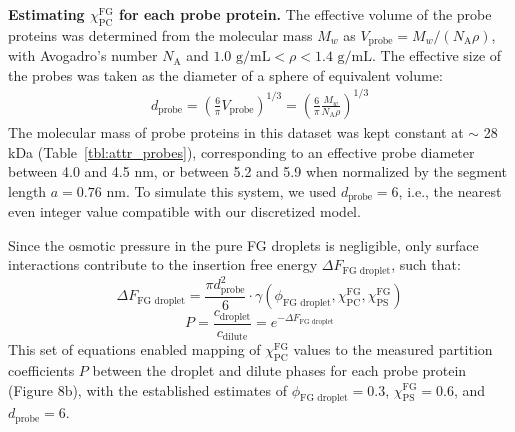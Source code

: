 \documentclass[10pt, a4paper, twocolumn]{article}
\newcommand{\todo}[1]{\pdfcomment{#1}} %
\begin{document}
\bigskip\noindent
\textbf{Estimating $\chi_\text{PC}^\text{FG}$ for each probe protein.} 
The effective volume of the probe proteins was determined from the molecular mass $M_w$ as $V_\text{probe} = M_w / (N_\text{A} \rho)$, with Avogadro's number $N_\text{A}$ and $1.0 \text{ g/mL} < \rho < 1.4 \text{ g/mL}$.
The effective size of the probes was taken as the diameter of a sphere of equivalent volume:
\begin{eqnarray}
    d_\text{probe} =
    \left( \frac{6}{\pi} V_\text{probe} \right)^{1/3} =
    \left( \frac{6}{\pi} \frac{M_w}{N_\text{A} \rho} \right)^{1/3}
\end{eqnarray}
The molecular mass of probe proteins in this dataset was kept constant at $\sim$ 28 kDa (Table~\ref{tbl:attr_probes}), corresponding to an effective probe diameter between 4.0 and 4.5 nm, or between 5.2 and 5.9 when normalized by the segment length $a = 0.76 \text{ nm}$.
To simulate this system, we used $d_\text{probe} = 6$, i.e., the nearest even integer value compatible with our discretized model.

Since the osmotic pressure in the pure FG droplets is negligible, only surface interactions contribute to the insertion free energy $\Delta F_\text{FG droplet}$, such that:
\begin{equation}
    \Delta F_\text{FG droplet} =
    \frac{\pi d_\text{probe}^2}{6} \cdot \gamma\left(
    \phi_\text{FG droplet}, \chi_\text{PC}^\text{FG},
    \chi_\text{PS}^\text{FG}
    \right)
    \label{eq:FG_droplet_IFE}
\end{equation}
\begin{equation}
    P = \frac{c_\text{droplet}}{c_\text{dilute}} = e^{-\Delta F_\text{FG droplet}}
    \label{eq:FG_droplet_P}
\end{equation}
This set of equations enabled mapping of $\chi_\text{PC}^\text{FG}$ values to the measured partition coefficients $P$ between the droplet and dilute phases for each probe protein (Figure 8b), with the established estimates of $\phi_\text{FG droplet} = 0.3$, $\chi_{\text{PS}}^{\text{FG}} = 0.6$, and $d_\text{probe} = 6$.
\end{document}
